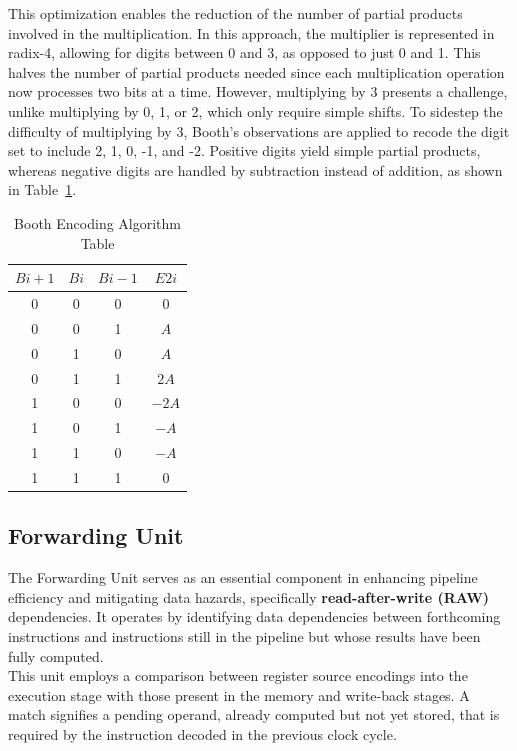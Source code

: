 This optimization enables the reduction of the number of partial products involved in the multiplication. In this approach, the multiplier is represented in radix-4, allowing for digits between 0 and 3, as opposed to just 0 and 1. This halves the number of partial products needed since each multiplication operation now processes two bits at a time. However, multiplying by 3 presents a challenge, unlike multiplying by 0, 1, or 2, which only require simple shifts. To sidestep the difficulty of multiplying by 3, Booth's observations are applied to recode the digit set to include 2, 1, 0, -1, and -2. Positive digits yield simple partial products, whereas negative digits are handled by subtraction instead of addition, as shown in Table~\ref{tab:booth_encoding}. \\

\begin{table}[!htbp]
    \centering
    \begin{tabular}{|c|c|c|c|}
        \hline
        \( Bi+1 \) & \( Bi \) & \( Bi-1 \) & \( E2i \) \\
        \hline
        0 & 0 & 0 & 0 \\
        0 & 0 & 1 & \( A \) \\
        0 & 1 & 0 & \( A \) \\
        0 & 1 & 1 & \( 2A \) \\
        1 & 0 & 0 & \( -2A \) \\
        1 & 0 & 1 & \( -A \) \\
        1 & 1 & 0 & \( -A \) \\
        1 & 1 & 1 & 0 \\
        \hline
    \end{tabular}
    \caption{Booth Encoding Algorithm Table}
    \label{tab:booth_encoding}
\end{table}

\subsection{Forwarding Unit}
The Forwarding Unit serves as an essential component in enhancing pipeline efficiency and mitigating data hazards, specifically \textbf{read-after-write (RAW)} dependencies. It operates by identifying data dependencies between forthcoming instructions and instructions still in the pipeline but whose results have been fully computed. \\

This unit employs a comparison between register source encodings into the execution stage with those present in the memory and write-back stages. A match signifies a pending operand, already computed but not yet stored, that is required by the instruction decoded in the previous clock cycle. \\

